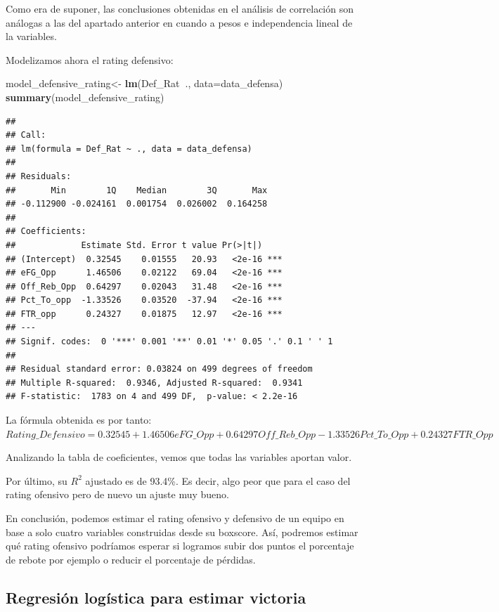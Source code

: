 \documentclass[
]{article}
\newenvironment{Shaded}{\begin{snugshade}}{\end{snugshade}}
\newcommand{\DataTypeTok}[1]{\textcolor[rgb]{0.13,0.29,0.53}{#1}}
\newcommand{\KeywordTok}[1]{\textcolor[rgb]{0.13,0.29,0.53}{\textbf{#1}}}
\newcommand{\NormalTok}[1]{#1}
\newcommand{\OperatorTok}[1]{\textcolor[rgb]{0.81,0.36,0.00}{\textbf{#1}}}
\newcommand{\StringTok}[1]{\textcolor[rgb]{0.31,0.60,0.02}{#1}}
\begin{document}
Como era de suponer, las conclusiones obtenidas en el análisis de
correlación son análogas a las del apartado anterior en cuando a pesos e
independencia lineal de la variables.

Modelizamos ahora el rating defensivo:

\begin{Shaded}
\begin{Highlighting}[]
\NormalTok{model_defensive_rating<-}\StringTok{ }\KeywordTok{lm}\NormalTok{(Def_Rat}\OperatorTok{~}\NormalTok{., }\DataTypeTok{data=}\NormalTok{data_defensa)}
\KeywordTok{summary}\NormalTok{(model_defensive_rating)}
\end{Highlighting}
\end{Shaded}

\begin{verbatim}
## 
## Call:
## lm(formula = Def_Rat ~ ., data = data_defensa)
## 
## Residuals:
##       Min        1Q    Median        3Q       Max 
## -0.112900 -0.024161  0.001754  0.026002  0.164258 
## 
## Coefficients:
##             Estimate Std. Error t value Pr(>|t|)    
## (Intercept)  0.32545    0.01555   20.93   <2e-16 ***
## eFG_Opp      1.46506    0.02122   69.04   <2e-16 ***
## Off_Reb_Opp  0.64297    0.02043   31.48   <2e-16 ***
## Pct_To_opp  -1.33526    0.03520  -37.94   <2e-16 ***
## FTR_opp      0.24327    0.01875   12.97   <2e-16 ***
## ---
## Signif. codes:  0 '***' 0.001 '**' 0.01 '*' 0.05 '.' 0.1 ' ' 1
## 
## Residual standard error: 0.03824 on 499 degrees of freedom
## Multiple R-squared:  0.9346, Adjusted R-squared:  0.9341 
## F-statistic:  1783 on 4 and 499 DF,  p-value: < 2.2e-16
\end{verbatim}

La fórmula obtenida es por tanto:
\(Rating\_Defensivo=0.32545+1.46506eFG\_Opp+0.64297Off\_Reb\_Opp-1.33526Pct\_To\_Opp+0.24327FTR\_Opp\)

Analizando la tabla de coeficientes, vemos que todas las variables
aportan valor.

Por último, su \(R^2\) ajustado es de 93.4\%. Es decir, algo peor que
para el caso del rating ofensivo pero de nuevo un ajuste muy bueno.

En conclusión, podemos estimar el rating ofensivo y defensivo de un
equipo en base a solo cuatro variables construidas desde su boxscore.
Así, podremos estimar qué rating ofensivo podríamos esperar si logramos
subir dos puntos el porcentaje de rebote por ejemplo o reducir el
porcentaje de pérdidas.

\hypertarget{regresiuxf3n-loguxedstica-para-estimar-victoria}{%
\subsection{Regresión logística para estimar
victoria}\label{regresiuxf3n-loguxedstica-para-estimar-victoria}}
\end{document}
